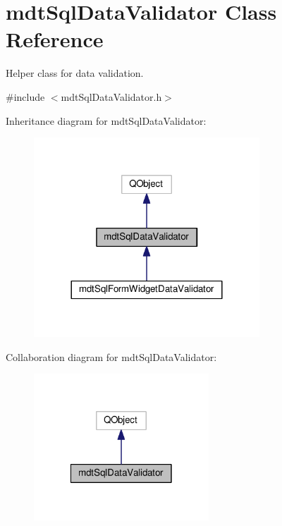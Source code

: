 \hypertarget{classmdt_sql_data_validator}{\section{mdt\-Sql\-Data\-Validator Class Reference}
\label{classmdt_sql_data_validator}
}


Helper class for data validation.  




{\ttfamily \#include $<$mdt\-Sql\-Data\-Validator.\-h$>$}



Inheritance diagram for mdt\-Sql\-Data\-Validator\-:
\nopagebreak
\begin{figure}[H]
\begin{center}
\leavevmode
\includegraphics[width=240pt]{classmdt_sql_data_validator__inherit__graph}
\end{center}
\end{figure}


Collaboration diagram for mdt\-Sql\-Data\-Validator\-:
\nopagebreak
\begin{figure}[H]
\begin{center}
\leavevmode
\includegraphics[width=186pt]{classmdt_sql_data_validator__coll__graph}
\end{center}
\end{figure}
